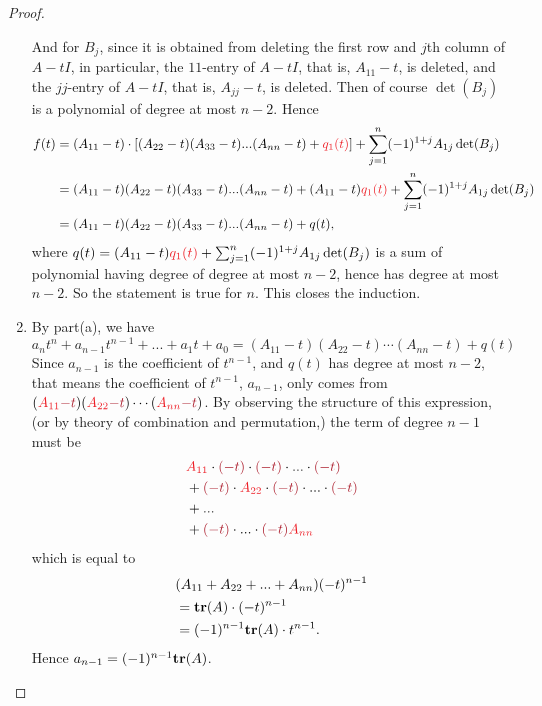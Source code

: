 \begin{proof}
\begin{enumerate}
And for \(B_j\), since it is obtained from deleting the first row and \(j\)th column of \(A - tI\), in particular, the \(11\)-entry of \(A - tI\), that is, \(A_{11} - t\), is deleted, and the \(jj\)-entry of \(A - tI\), that is, \(A_{jj} - t\), is deleted.
Then of course \(\det(B_j)\) is a polynomial of degree at most \(n - 2\).
Hence
\begin{align*}
    f(t) & = (A_{11} - t) \cdot \left[ (A_{22} - t)(A_{33} - t) ... (A_{nn} - t) + \RED{q_1(t)} \right] + \sum_{j = 1}^n (-1)^{1 + j} A_{1j} \det(B_j) \\
        & = (A_{11} - t)(A_{22} - t)(A_{33} - t) ... (A_{nn} - t) + (A_{11} - t)\RED{q_1(t)} + \sum_{j = 1}^n (-1)^{1 + j} A_{1j} \det(B_j) \\
        & = (A_{11} - t)(A_{22} - t)(A_{33} - t) ... (A_{nn} - t) + q(t),
\end{align*}
where \(q(t) = (A_{11} - t)\RED{q_1(t)} + \sum_{j = 1}^n (-1)^{1 + j} A_{1j} \det(B_{j})\) is a sum of polynomial having degree of degree at most \(n - 2\), hence has degree at most \(n - 2\).
So the statement is true for \(n\).
This closes the induction.

\item By part(a), we have
\[
    a_n t^n + a_{n - 1}t^{n - 1} + ... + a_1 t + a_0 = (A_{11} - t)(A_{22} - t) \cdots (A_{nn} - t) + q(t)
\]
Since \(a_{n - 1}\) is the coefficient of \(t^{n - 1}\), and \(q(t)\) has degree at most \(n - 2\), that means the coefficient of \(t^{n - 1}\), \(a_{n - 1}\), only comes from \((\RED{A_{11}} \MAROON{- t})(\RED{A_{22}} \MAROON{- t}) \cdots (\RED{A_{nn}} \MAROON{- t})\).
By observing the structure of this expression, (or by theory of combination and permutation,) the term of degree \(n - 1\) must be
\begin{align*}
    & \RED{A_{11}} \cdot \MAROON{(-t)} \cdot \MAROON{(-t)} \cdot ... \cdot \MAROON{(-t)} \\
    & + \MAROON{(-t)} \cdot \RED{A_{22}} \cdot \MAROON{(-t)} \cdot ... \cdot \MAROON{(-t)} \\
    & + ... \\
    & + \MAROON{(-t)} \cdot ... \cdot \MAROON{(-t)} \RED{A_{nn}}
\end{align*}
which is equal to
\begin{align*}
    & (A_{11} + A_{22} + ... + A_{nn})(-t)^{n - 1} \\
    & = \textbf{tr}(A) \cdot (-t)^{n - 1} \\
    & = (-1)^{n - 1} \textbf{tr}(A) \cdot t^{n - 1}.
\end{align*}
Hence \(a_{n - 1} = (-1)^{n - 1} \textbf{tr}(A)\).
\end{enumerate}
\end{proof}

